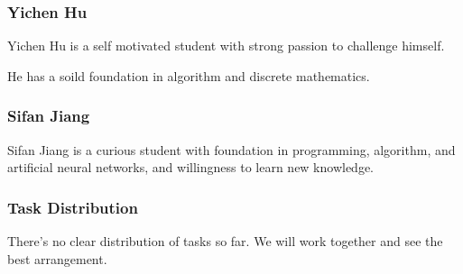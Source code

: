 \documentclass[xcolor=table]{beamer}
\begin{document}
\begin{mdframe}%

\frametitle{Yichen Hu}\label{heading-sec-yichen-hu}%

\noindent{}Yichen Hu is a self motivated student with strong passion to challenge himself.%

He has a soild foundation in algorithm and discrete mathematics.%
\end{mdframe}\label{sec-yichen-hu}%

\begin{mdframe}%

\frametitle{Sifan Jiang}\label{heading-sec-sifan-jiang}%

\noindent{}Sifan Jiang is a curious student with foundation in programming, algorithm, and artificial neural networks, and willingness to learn new knowledge.%
\end{mdframe}\label{sec-sifan-jiang}%

\begin{mdframe}%

\frametitle{Task Distribution}\label{heading-sec-task-distribution}%

\noindent{}There's no clear distribution of tasks so far. We will work together and see the best arrangement.%
\end{mdframe}\label{sec-task-distribution}%
\end{document}
